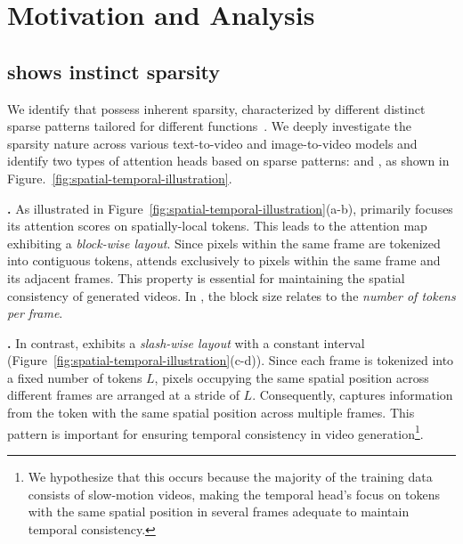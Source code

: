 \section{Motivation and Analysis}
\label{sec:sparse_patterns}


\subsection{\Attn{} shows instinct sparsity}
\label{subsec:sparse-pattern}
We identify that \attn{} possess inherent sparsity, characterized by different distinct sparse patterns tailored for different functions~\citep{xiao2024duoattention}. We deeply investigate the sparsity nature across various text-to-video and image-to-video models and identify two types of attention heads based on sparse patterns: \textit{\SpatialHead{}} and \textit{\TemporalHead{}}, as shown in Figure.~\ref{fig:spatial-temporal-illustration}.


\textbf{\SpatialHead{}.} As illustrated in Figure~\ref{fig:spatial-temporal-illustration}(a-b), \spatialhead{} primarily focuses its attention scores on spatially-local tokens. This leads to the attention map exhibiting a \textit{block-wise layout}. Since pixels within the same frame are tokenized into contiguous tokens, \spatialhead{} attends exclusively to pixels within the same frame and its adjacent frames. This property is essential for maintaining the spatial consistency of generated videos. In \spatialhead{}, the block size relates to the \textit{number of tokens per frame}. 

\textbf{\TemporalHead{}.} In contrast, \temporalhead{} exhibits a \textit{slash-wise layout} with a constant interval (Figure~\ref{fig:spatial-temporal-illustration}(c-d)). Since each frame is tokenized into a fixed number of tokens $L$, pixels occupying the same spatial position across different frames are arranged at a stride of $L$. Consequently, \temporalhead{} captures information from the token with the same spatial position across multiple frames. This pattern is important for ensuring temporal consistency in video generation\footnote{We hypothesize that this occurs because the majority of the training data consists of slow-motion videos, making the temporal head's focus on tokens with the same spatial position in several frames adequate to maintain temporal consistency.}.


